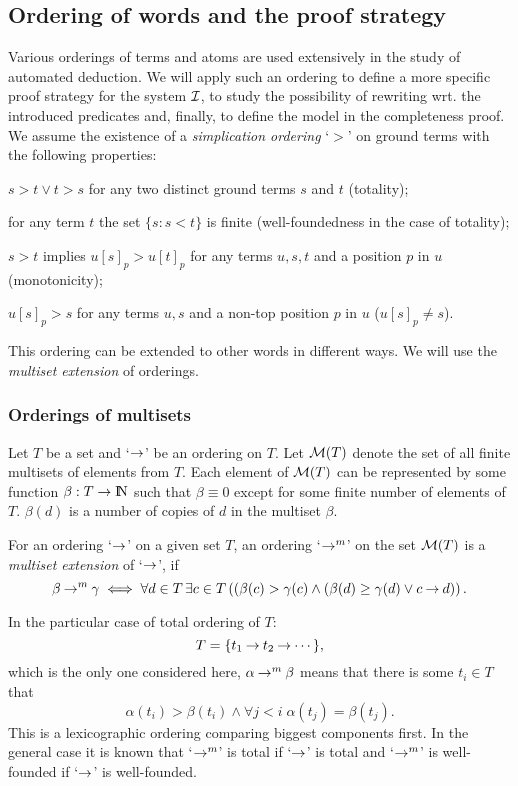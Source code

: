 \subsection{Ordering of words and the proof strategy}

Various orderings of terms and atoms are used extensively in the study of 
automated deduction. We will apply such an ordering to define a more specific
proof strategy for the system $\mbox{$\cal I$}$, to study the possibility of rewriting
wrt. the introduced predicates and, finally, to define the model in the
completeness proof. We assume the existence of 
a {\em simplication ordering} `$>$' \cite{Der} on ground terms with the
following properties:
\begin{description}\MyLPar
\item [O1.] $s>t\lor t>s$ for any two distinct ground terms $s$ and $t$ (totality);
\item [O2.] for any term $t$ the set \(\{s:s<t\}\) is finite (well-foundedness
in the case of totality);
\item [O3.] $s>t$ implies $u[s]_p>u[t]_p$ for any terms $u,s,t$ and a position
$p$ in $u$ (monotonicity);
\item [O4.] $u[s]_p>s$ for any terms $u,s$ and a non-top position $p$ in $u$
($u[s]_p\ne s$).
\end{description}

This ordering can be extended to other words in different ways. We
will use the {\em multiset extension} of orderings.

\subsubsection{Orderings of multisets}

Let $T$ be a set and `$\mathbin{\rightarrow}$' be an ordering on $T$. %
Let
${\cal M}(T)$ denote the set of all finite multisets of elements from $T$. Each
element of ${\cal M}(T)$ can be represented by some function \(\beta:T\to {{\rm I\hspace{-.2em}N}}\)
such that \(\beta\equiv 0\) except for some finite number of elements of $T$.
\(\beta(d)\) is a number of copies of $d$ in the multiset $\beta$.
\begin{DEFINITION} \label{def:multiset-ordering}
For an ordering `$\mathbin{\rightarrow}$' on a given set $T$, an ordering `\(\mathbin{\mathord{\mathbin{\rightarrow}}^m}\)' on the
set \({\cal M}(T)\) is a {\em multiset extension} of `$\mathbin{\rightarrow}$', if
\[\beta\mathbin{\mathord{\mathbin{\rightarrow}}^m}\gamma \iff \forall d\in  T\,\exists c\in T\/ \left((\beta(c)>\gamma(c) 
\land (\beta(d)\geq \gamma(d) \lor c\mathbin{\rightarrow} d)\right).\]
\end{DEFINITION}
In the particular case of total ordering of $T$:
\[T=\{t_1\mathbin{\rightarrow} t_2\mathbin{\rightarrow}\cdots\},\] 
which is the only one considered here, \(\alpha\mathbin{\mathord{\mathbin{\rightarrow}}^m}\beta\) 
means that there is some $t_i\in T$ that
\[\alpha(t_i)>\beta(t_i)\land \forall j<i\; \alpha(t_j)=\beta(t_j).\]
This is a lexicographic ordering comparing biggest components first. In the
general case it is known \cite{DM} that `$\mathbin{\mathord{\mathbin{\rightarrow}}^m}$' is total if `$\mathbin{\rightarrow}$' is
total and `$\mathbin{\mathord{\mathbin{\rightarrow}}^m}$' is well-founded if `$\mathbin{\rightarrow}$' is well-founded.

